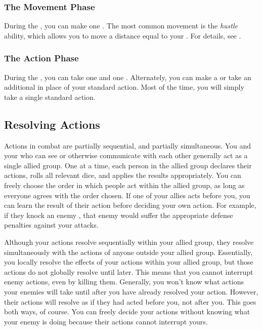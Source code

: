         \subsubsection{The Movement Phase}\label{The Movement Phase}
            During the , you can make one .
            The most common movement is the \textit{hustle} ability, which allows you to move a distance equal to your .
            For details, see .

        \subsubsection{The Action Phase}\label{The Action Phase}
            During the , you can take one  and one .
            Alternately, you can make a  or take an additional  in place of your standard action.
            Most of the time, you will simply take a single standard action.

    \subsection{Resolving Actions}\label{Resolving Actions}

        Actions in combat are partially sequential, and partially simultaneous.
        You and your  who can see or otherwise communicate with each other generally act as a single allied group.
        One at a time, each person in the allied group declares their actions, rolls all relevant dice, and applies the results appropriately.
        You can freely choose the order in which people act within the allied group, as long as everyone agrees with the order chosen.
        If one of your allies acts before you, you can learn the result of their action before deciding your own action.
        For example, if they knock an enemy \prone, that enemy would suffer the appropriate defense penalties against your attacks.

        Although your actions resolve sequentially within your allied group, they resolve simultaneously with the actions of anyone outside your allied group.
        Essentially, you locally resolve the effects of your actions within your allied group, but those actions do not globally resolve until later.
        This means that you cannot interrupt enemy actions, even by killing them.
        Generally, you won't know what actions your enemies will take until after you have already resolved your action.
        However, their actions will resolve as if they had acted before you, not after you.
        This goes both ways, of course.
        You can freely decide your actions without knowing what your enemy is doing because their actions cannot interrupt yours.

